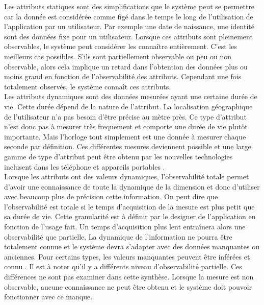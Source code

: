 \documentclass[conference]{./sty/IEEEtran}
\begin{document}
Les attributs statiques sont des simplifications que le système peut se
permettre car la donnée est considérée comme figé dans le temps le long de
l'utilisation de l'application par un utilisateur. Par exemple une date de
naissance, une identité sont des données fixe pour un utilisateur. Lorsque ces
attributs sont pleinement observables, le système peut considérer les connaître
entièrement. C'est les meilleurs cas possibles. S'ils sont partiellement
observable ou peu ou non observable, alors cela implique un retard dans
l'obtention des données plus ou moins grand en fonction de l'observabilité des
attributs. Cependant une fois totalement observés, le système connaît ces
attributs. \\

Les attributs dynamiques sont des données mesurées ayant une certaine durée de
vie. Cette durée dépend de la nature de l'attribut. La localisation
géographique de l'utilisateur n'a pas besoin d'être précise au mètre près. Ce
type d'attribut n'est donc pas à mesurer très frequement et comporte une durée
de vie plutôt importante. Mais l'horloge tout simplement est une donnée à
mesurer chaque seconde par définition. Ces différentes mesures deviennent
possible et une large gamme de type d'attribut peut être obtenu par les
nouvelles technologies inclusent dans les téléphone et appareils portables
\cite{DBLP:conf/wstst/Kurti08}. \\

Lorsque les attributs ont des valeurs dynamiques, l'observabilité totale permet
d'avoir une connaissance de toute la dynamique de la dimension et donc
d'utiliser avec beaucoup plus de précision cette information. On peut dire que
l'observabilité est totale si le temps d'acquisition de la mesure est plus
petit que sa durée de vie. Cette granularité est à définir par le designer de
l'application en fonction de l'usage fait. Un temps d'acquisition plus lent
entraînera alors une observabilité que partielle. La dynamique de l'information
ne pourra être totalement connue et le système devra s'adapter avec des données
manquantes ou anciennes. Pour certains types, les valeurs manquantes peuvent
être inférées et connu \cite{DBLP:journals/prl/TruccoFR99}. Il est à noter
qu'il y a différents niveau d'observabilité partielle. Ces différences ne sont
pas examiner dans cette synthèse. Lorsque la mesure est non observable, aucune
connaissance ne peut être obtenu et le système doit pouvoir fonctionner avec ce
manque. \\
\end{document}
